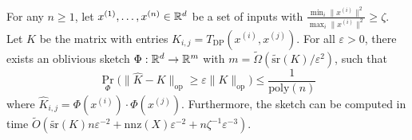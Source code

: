 For any $n\ge 1$, let $x^{(1)},\dots,x^{(n)}\in\mathbb{R}^d$ be a set of inputs with $\frac{\min_i \|x^{(i)}\|^2}{\max_i \|x^{(i)}\|^2} \geq \zeta$. Let $K$ be the matrix with entries $K_{i,j} = T_\text{DP}(x^{(i)},x^{(j)})$. For all $\varepsilon>0$, there exists an oblivious sketch $\Phi:\mathbb{R}^d \to \mathbb{R}^m$ with $m=\tilde\Omega(\tilde{\text{sr}}(K) /\varepsilon^{2})$, such that 
\begin{equation}
\Pr_{\Phi}\big(\|\widehat K-K\|_\text{op} \ge\varepsilon \|K\|_\text{op}\big) \leq \frac{1}{\text{poly}(n)}
\end{equation}
where $\widehat K_{i,j} = \Phi(x^{(i)})\cdot \Phi(x^{(j)})$. Furthermore, the sketch can be computed in time $\tilde O(\tilde{\text{sr}}(K)n\varepsilon^{-2}+\text{nnz}(X)\varepsilon^{-2}+n\zeta^{-1}\varepsilon^{-3})$.